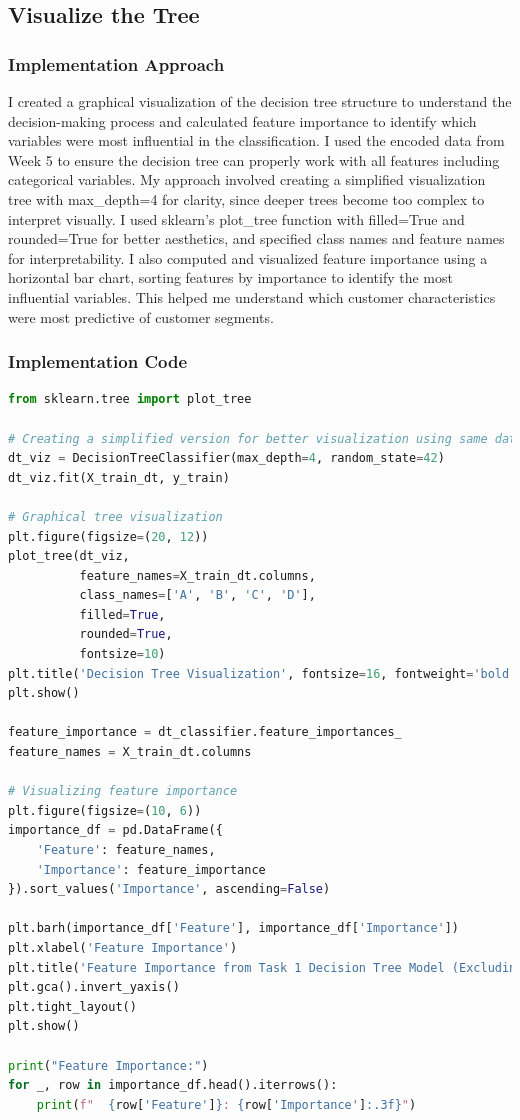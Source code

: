 \documentclass[12pt,a4paper]{article}
\begin{document}
\vspace{0.8cm}
\subsection{Visualize the Tree}

\subsubsection{Implementation Approach}
I created a graphical visualization of the decision tree structure to understand the decision-making process and calculated feature importance to identify which variables were most influential in the classification. I used the encoded data from Week 5 to ensure the decision tree can properly work with all features including categorical variables. My approach involved creating a simplified visualization tree with max\_depth=4 for clarity, since deeper trees become too complex to interpret visually. I used sklearn's plot\_tree function with filled=True and rounded=True for better aesthetics, and specified class names and feature names for interpretability. I also computed and visualized feature importance using a horizontal bar chart, sorting features by importance to identify the most influential variables. This helped me understand which customer characteristics were most predictive of customer segments.

\newpage
\subsubsection{Implementation Code}
\begin{lstlisting}[language=Python, caption=Visualize the Tree and Compute Accuracy]
from sklearn.tree import plot_tree

# Creating a simplified version for better visualization using same data
dt_viz = DecisionTreeClassifier(max_depth=4, random_state=42)
dt_viz.fit(X_train_dt, y_train)

# Graphical tree visualization
plt.figure(figsize=(20, 12))
plot_tree(dt_viz, 
          feature_names=X_train_dt.columns, 
          class_names=['A', 'B', 'C', 'D'], 
          filled=True, 
          rounded=True, 
          fontsize=10)
plt.title('Decision Tree Visualization', fontsize=16, fontweight='bold')
plt.show()

feature_importance = dt_classifier.feature_importances_
feature_names = X_train_dt.columns

# Visualizing feature importance
plt.figure(figsize=(10, 6))
importance_df = pd.DataFrame({
    'Feature': feature_names,
    'Importance': feature_importance
}).sort_values('Importance', ascending=False)

plt.barh(importance_df['Feature'], importance_df['Importance'])
plt.xlabel('Feature Importance')
plt.title('Feature Importance from Task 1 Decision Tree Model (Excluding ID, Var_1)')
plt.gca().invert_yaxis()
plt.tight_layout()
plt.show()

print("Feature Importance:")
for _, row in importance_df.head().iterrows():
    print(f"  {row['Feature']}: {row['Importance']:.3f}")
    
\end{lstlisting}
\end{document}
